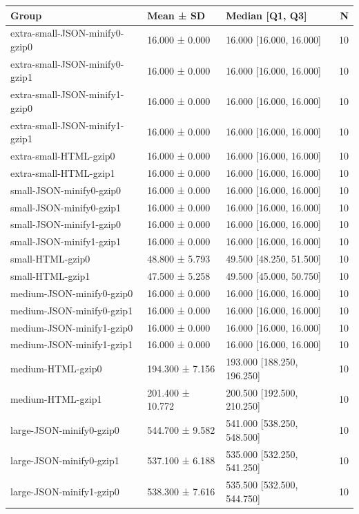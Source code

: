 \begin{tabular}{lllr}
\toprule
Group & Mean ± SD & Median [Q1, Q3] & N \\
\midrule
extra-small-JSON-minify0-gzip0 & 16.000 ± 0.000 & 16.000 [16.000, 16.000] & 10 \\
extra-small-JSON-minify0-gzip1 & 16.000 ± 0.000 & 16.000 [16.000, 16.000] & 10 \\
extra-small-JSON-minify1-gzip0 & 16.000 ± 0.000 & 16.000 [16.000, 16.000] & 10 \\
extra-small-JSON-minify1-gzip1 & 16.000 ± 0.000 & 16.000 [16.000, 16.000] & 10 \\
extra-small-HTML-gzip0 & 16.000 ± 0.000 & 16.000 [16.000, 16.000] & 10 \\
extra-small-HTML-gzip1 & 16.000 ± 0.000 & 16.000 [16.000, 16.000] & 10 \\
small-JSON-minify0-gzip0 & 16.000 ± 0.000 & 16.000 [16.000, 16.000] & 10 \\
small-JSON-minify0-gzip1 & 16.000 ± 0.000 & 16.000 [16.000, 16.000] & 10 \\
small-JSON-minify1-gzip0 & 16.000 ± 0.000 & 16.000 [16.000, 16.000] & 10 \\
small-JSON-minify1-gzip1 & 16.000 ± 0.000 & 16.000 [16.000, 16.000] & 10 \\
small-HTML-gzip0 & 48.800 ± 5.793 & 49.500 [48.250, 51.500] & 10 \\
small-HTML-gzip1 & 47.500 ± 5.258 & 49.500 [45.000, 50.750] & 10 \\
medium-JSON-minify0-gzip0 & 16.000 ± 0.000 & 16.000 [16.000, 16.000] & 10 \\
medium-JSON-minify0-gzip1 & 16.000 ± 0.000 & 16.000 [16.000, 16.000] & 10 \\
medium-JSON-minify1-gzip0 & 16.000 ± 0.000 & 16.000 [16.000, 16.000] & 10 \\
medium-JSON-minify1-gzip1 & 16.000 ± 0.000 & 16.000 [16.000, 16.000] & 10 \\
medium-HTML-gzip0 & 194.300 ± 7.156 & 193.000 [188.250, 196.250] & 10 \\
medium-HTML-gzip1 & 201.400 ± 10.772 & 200.500 [192.500, 210.250] & 10 \\
large-JSON-minify0-gzip0 & 544.700 ± 9.582 & 541.000 [538.250, 548.500] & 10 \\
large-JSON-minify0-gzip1 & 537.100 ± 6.188 & 535.000 [532.250, 541.250] & 10 \\
large-JSON-minify1-gzip0 & 538.300 ± 7.616 & 535.500 [532.500, 544.750] & 10 \\

\end{tabular}

